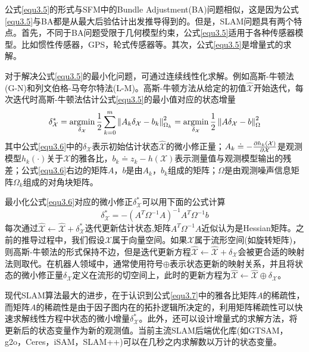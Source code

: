公式\eqref{equ3.5}的形式与SFM中的Bundle Adjustment(BA)问题相似，这是因为公式\eqref{equ3.5}与BA都是从最大后验估计出发推导得到的。但是，SLAM问题具有两个特点。首先，不同于BA问题受限于几何模型约束，公式\eqref{equ3.5}适用于各种传感器模型。比如惯性传感器，GPS，轮式传感器等。其次，公式\eqref{equ3.5}是增量式的求解。

对于解决公式\eqref{equ3.5}的最小化问题，可通过连续线性化求解。例如高斯-牛顿法(G-N)和列文伯格-马夸尔特法(L-M)。高斯-牛顿方法从给定的初值$\hat{\mathcal{X}}$开始迭代，每次迭代时高斯-牛顿法估计公式\eqref{equ3.5}的最小值对应的状态增量
\begin{equation}
\label{equ3.6}
\delta_\mathcal{X}^* 
=
\operatorname*{argmin} \limits_{\delta_\mathcal{X}} {1 \over 2} \sum \limits_{k=0}^{m} \left\| A_k\delta_\mathcal{X}-b_k \right\|_{\Omega_k}^2
=
\operatorname*{argmin} \limits_{\delta_\mathcal{X}} {1 \over 2} \left\| A\delta_\mathcal{X}-b \right\|_{\Omega}^2
\end{equation}
其中公式\eqref{equ3.6}中的$\delta_\mathcal{X}$表示初始估计状态$\hat{\mathcal{X}}$的微小修正量；$A_k \doteq - {\partial h_k(\mathcal{X}) \over \partial \mathcal{X}} $是观测模型$h_k(\cdot)$关于$\mathcal{X}$的雅各比，$b_k \doteq z_k-h(\mathcal{X})$表示测量值与观测模型输出的残差；公式\eqref{equ3.6}右边的矩阵$A$，$b$是由$A_k$，$b_k$组成的矩阵；$\Omega$是由观测噪声信息矩阵$\Omega_k$组成的对角块矩阵。

最小化公式\eqref{equ3.6}对应的微小修正$\delta_\mathcal{X}^* $可以用下面的公式计算
\begin{equation}
\label{equ3.7}
\delta_\mathcal{X}^* = - \left( A^T \Omega^{-1} A \right)^{-1} A^T \Omega^{-1} b
\end{equation}
每次通过$\hat{\mathcal{X}} \leftarrow \hat{\mathcal{X}}+\delta_\mathcal{X}^*$迭代更新估计状态,矩阵$A^T \Omega^{-1} A$近似认为是Hessian矩阵。之前的推导过程中，我们假设$\mathcal{X}$属于向量空间。如果$\mathcal{X}$属于流形空间(如旋转矩阵)，则高斯-牛顿法的形式保持不边，但是迭代更新方程$\hat{\mathcal{X}} \leftarrow \hat{\mathcal{X}}+\delta_\mathcal{X}$会被更合适的映射法则\upcite{[3.5]}取代。在机器人领域中，通常使用符号$\oplus$表示状态更新的映射关系，并且将状态的微小修正量$\delta_\mathcal{X}$定义在流形的切空间上，此时的更新方程为$\hat{\mathcal{X}}  \leftarrow \hat{\mathcal{X}} \oplus \delta_\mathcal{X}$。

现代SLAM算法最大的进步，在于认识到公式\eqref{equ3.7}中的雅各比矩阵$A$的稀疏性，而矩阵$A$的稀疏性是由于因子图内在的拓扑逻辑所决定的，利用矩阵稀疏性可以快速求解线性方程中状态的微小增量$\delta_\mathcal{X}^*$。此外，还可以设计增量式的求解方法，将更新后的状态变量作为新的观测值。当前主流SLAM后端优化库(如GTSAM，g2o，Ceres，iSAM，SLAM++)可以在几秒之内求解数以万计的状态变量。



